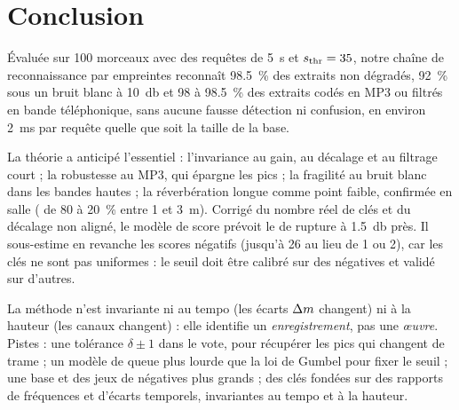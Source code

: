 \section{Conclusion}
\label{sec-conclusion}

Évaluée sur 100 morceaux avec des requêtes de \qty{5}{\second} et $s_{\mathrm{thr}} = 35$, notre chaîne
de reconnaissance par empreintes reconnaît \qty{98.5}{\percent} des extraits non dégradés,
\qty{92}{\percent} sous un bruit blanc à \qty{10}{\decibel} et 98 à \qty{98.5}{\percent} des
extraits codés en MP3 ou filtrés en bande téléphonique, sans aucune fausse détection ni
confusion, en environ \qty{2}{\milli\second} par requête quelle que soit la taille de la base.

La théorie a anticipé l'essentiel : l'invariance au gain, au décalage et au filtrage court ;
la robustesse au MP3, qui épargne les pics ; la fragilité au bruit blanc dans les bandes
hautes ; la réverbération longue comme point faible, confirmée en salle (\TBD{} de 80 à
\qty{20}{\percent} entre 1 et \qty{3}{\metre}). Corrigé du nombre réel de clés et du décalage
non aligné, le modèle de score prévoit le \RSB{} de rupture à \qty{1.5}{\decibel} près. Il
sous-estime en revanche les scores négatifs (jusqu'à 26 au lieu de 1 ou 2), car les clés ne
sont pas uniformes : le seuil doit être calibré sur des négatives et validé sur d'autres.

La méthode n'est invariante ni au tempo (les écarts $\Delta m$ changent) ni à la hauteur (les
canaux changent) : elle identifie un \emph{enregistrement}, pas une \emph{œuvre}. Pistes : une
tolérance $\delta \pm 1$ dans le vote, pour récupérer les pics qui changent de trame ; un
modèle de queue plus lourde que la loi de Gumbel pour fixer le seuil ; une base et des jeux de
négatives plus grands ; des clés fondées sur des rapports de fréquences et d'écarts temporels,
invariantes au tempo et à la hauteur.
